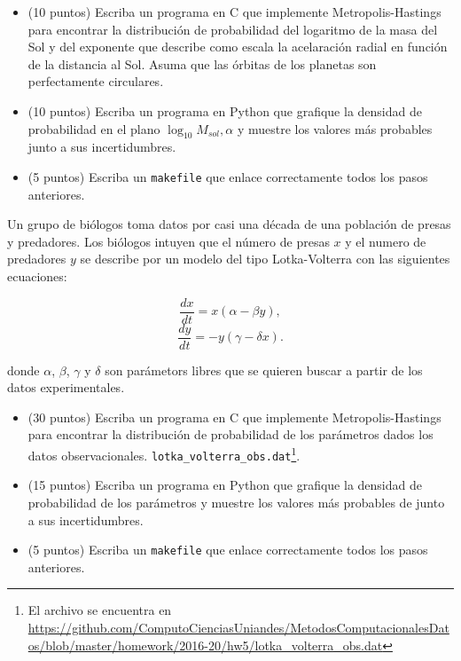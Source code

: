 \documentclass[11pt,letterpaper]{exam}
\begin{document}
\begin{questions}
\begin{itemize}
\item (10 puntos) Escriba un programa en C que implemente
  Metropolis-Hastings para encontrar la distribuci\'on de probabilidad
  del logaritmo de la masa del Sol y del exponente que describe como
  escala la acelaraci\'on radial en funci\'on de la distancia al
  Sol. Asuma que las \'orbitas de los planetas son perfectamente
  circulares. 
\item (10 puntos) Escriba un programa en Python que grafique la
  densidad de probabilidad en el plano $\log_{10} M_{sol},\alpha$ y 
  muestre los valores m\'as probables junto a sus
  incertidumbres. 
\item (5 puntos) Escriba un \verb"makefile" que enlace correctamente
  todos los pasos anteriores.
\end{itemize}


Un grupo de bi\'ologos toma datos por casi una d\'ecada de una
poblaci\'on de presas y predadores. Los bi\'ologos intuyen que el
n\'umero de presas $x$ y el numero de predadores $y$ se describe por
un modelo del tipo Lotka-Volterra con las siguientes ecuaciones:

\begin{equation}
\frac{dx}{dt}=x(\alpha - \beta y),
\end{equation}
\begin{equation}
\frac{dy}{dt}=-y(\gamma -\delta x).
\end{equation}

donde $\alpha$, $\beta$, $\gamma$ y $\delta$ son par\'ametors libres
que se quieren buscar a partir de los datos experimentales.

\begin{itemize}
\item (30 puntos) Escriba un programa en C que implemente
  Metropolis-Hastings para
  encontrar la distribuci\'on de probabilidad de los par\'ametros
  dados los datos observacionales.
  \verb"lotka_volterra_obs.dat"\footnote{El archivo se encuentra en
\url{https://github.com/ComputoCienciasUniandes/MetodosComputacionalesDatos/blob/master/homework/2016-20/hw5/lotka_volterra_obs.dat}}.

\item (15 puntos) Escriba un programa en Python que grafique la
  densidad de probabilidad de los par\'ametros y 
  muestre los valores m\'as probables de junto a sus
  incertidumbres. 

\item (5 puntos) Escriba un \verb"makefile" que enlace correctamente
  todos los pasos anteriores.
\end{itemize}


\end{questions}
\end{document}
